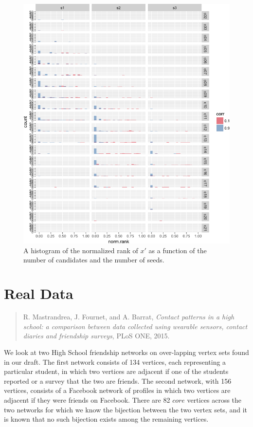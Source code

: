\documentclass[]{article}
\begin{document}
\begin{figure}
\centering
\includegraphics{vn_files/figure-latex/rank2-1.png}
\caption{A histogram of the normalized rank of \(x'\) as a function of
the number of candidates and the number of seeds.}
\end{figure}

\section{Real Data}\label{real-data}

\begin{quote}
R. Mastrandrea, J. Fournet, and A. Barrat, \emph{Contact patterns in a
high school: a comparison between data collected using wearable sensors,
contact diaries and friendship surveys}, PLoS ONE, 2015.
\end{quote}

We look at two High School friendship networks on over-lapping vertex
sets found in our draft. The first network consists of 134 vertices,
each representing a particular student, in which two vertices are
adjacent if one of the students reported or a survey that the two are
friends. The second network, with 156 vertices, consists of a Facebook
network of profiles in which two vertices are adjacent if they were
friends on Facebook. There are 82 \(core\) vertices across the two
networks for which we know the bijection between the two vertex sets,
and it is known that no such bijection exists among the remaining
vertices.
\end{document}
